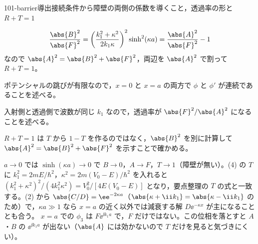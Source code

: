 \documentclass[uplatex,dvipdfmx,a4paper,11pt]{jsarticle}
\begin{document}
\begin{mondai}{101-barrier}{導出}{接続条件から障壁の両側の係数を導くこと，透過率の形と $R+T=1$}
\begin{tadashii}
\[ \frac{\abs{B}^{2}}{\abs{F}^{2}}=\left(\frac{k_{1}^{2}+\kappa^{2}}{2k_{1}\kappa}\right)^{2}\sinh^{2}(\kappa a)=\frac{\abs{A}^{2}}{\abs{F}^{2}}-1 \]
なので $\abs{A}^{2}=\abs{B}^{2}+\abs{F}^{2}$，両辺を $\abs{A}^{2}$ で割って $R+T=1$。
\begin{ronten}
  \item {} ポテンシャルの跳びが有限なので，$x=0$ と $x=a$ の両方で $\phi$ と $\phi'$ が連続であることを述べる。
  \item {} 入射側と透過側で波数が同じ $k_{1}$ なので，透過率が $\abs{F}^{2}/\abs{A}^{2}$ になることを述べる。
  \item {} $R+T=1$ は $T$ から $1-T$ を作るのではなく，$\abs{B}^{2}$ を別に計算して $\abs{A}^{2}=\abs{B}^{2}+\abs{F}^{2}$ を示すことで確かめる。
\end{ronten}
\kenzan $a\to0$ では $\sinh(\kappa a)\to0$ で $B\to0$，$A\to F$，$T\to1$（障壁が無い）。(4) の $T$ に $k_{1}^{2}=2mE/\hbar^{2}$，$\kappa^{2}=2m(V_{0}-E)/\hbar^{2}$ を入れると $(k_{1}^{2}+\kappa^{2})^{2}/(4k_{1}^{2}\kappa^{2})=V_{0}^{2}/[4E(V_{0}-E)]$ となり，要点整理の $T$ の式と一致する。(2) から $\abs{C/D}=\ee^{-2\kappa a}$（$\abs{\kappa+\ii k_{1}}=\abs{\kappa-\ii k_{1}}$ のため）で，$\kappa a\gg1$ なら $x=a$ の近く以外では減衰する解 $D\ee^{-\kappa x}$ が主になることとも合う。
\tsumazuki $x=a$ での $\phi_{3}$ は $F\ee^{\ii k_{1}a}$ で，$F$ だけではない。この位相を落とすと $A$・$B$ の $\ee^{\ii k_{1}a}$ が出ない（$\abs{A}$ には効かないので $T$ だけを見ると気づきにくい）。
\end{tadashii}
\end{mondai}

\noteowari
\end{document}
